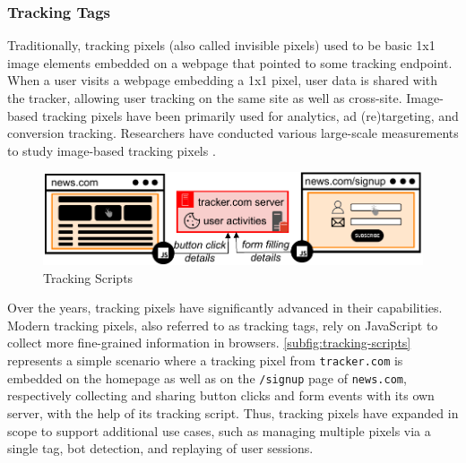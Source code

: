 \vspace{-2mm}
\subsubsection{Tracking Tags}
Traditionally, tracking pixels (also called invisible pixels) used to be basic 1x1 image elements embedded on a webpage that pointed to some tracking endpoint.
%
When a user visits a webpage embedding a 1x1 pixel, user data is shared with the tracker, allowing user tracking on the same site as well as cross-site.
%
Image-based tracking pixels have been primarily used for analytics, ad (re)targeting, and conversion tracking. 
%
Researchers have conducted various large-scale measurements to study image-based tracking pixels \cite{Narayanan2017WebtapSpringer,englehardtOnlineTracking1millionsite2016,lernerInternetJonesRaiders2016, bekosHitchhikersGuideFacebook2023, agarwal2021under,vekaria2021differential}.

\begin{figure}[htbp]
    \vspace{-2mm}
    \centering
    \includegraphics[width=1\linewidth]{figures/tracking-mechanisms-tracking-tags.pdf}
    \caption{Tracking Scripts}
    \label{subfig:tracking-scripts}
    \vspace{-2mm}
\end{figure}

Over the years, tracking pixels have significantly advanced in their capabilities.
%
Modern tracking pixels, also referred to as tracking tags, rely on JavaScript to collect more fine-grained information in browsers. 
%
\autoref{subfig:tracking-scripts} represents a simple scenario where a tracking pixel from \texttt{tracker.com} is embedded on the homepage as well as on the \texttt{/signup} page of \texttt{news.com}, respectively collecting and sharing button clicks and form events with its own server, with the help of its tracking script.
%
Thus, tracking pixels have expanded in scope to support additional use cases, such as managing multiple pixels via a single tag, bot detection, and replaying of user sessions.




